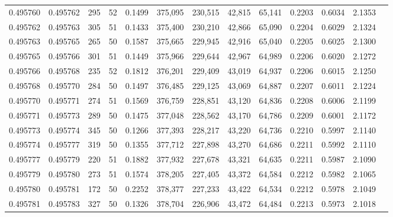 \begin{tabular}{rrrrrrrrrrrrr}
0.495760 & 0.495762 &   295 &  52 &                                     0.1499 & 375,095 & 230,515 &  42,815 &  65,141 & 0.2203 & 0.6034 & 2.1353 \\
0.495762 & 0.495763 &   305 &  51 &                                     0.1433 & 375,400 & 230,210 &  42,866 &  65,090 & 0.2204 & 0.6029 & 2.1324 \\
0.495763 & 0.495765 &   265 &  50 &                                     0.1587 & 375,665 & 229,945 &  42,916 &  65,040 & 0.2205 & 0.6025 & 2.1300 \\
0.495765 & 0.495766 &   301 &  51 &                                     0.1449 & 375,966 & 229,644 &  42,967 &  64,989 & 0.2206 & 0.6020 & 2.1272 \\
0.495766 & 0.495768 &   235 &  52 &                                     0.1812 & 376,201 & 229,409 &  43,019 &  64,937 & 0.2206 & 0.6015 & 2.1250 \\
0.495768 & 0.495770 &   284 &  50 &                                     0.1497 & 376,485 & 229,125 &  43,069 &  64,887 & 0.2207 & 0.6011 & 2.1224 \\
0.495770 & 0.495771 &   274 &  51 &                                     0.1569 & 376,759 & 228,851 &  43,120 &  64,836 & 0.2208 & 0.6006 & 2.1199 \\
0.495771 & 0.495773 &   289 &  50 &                                     0.1475 & 377,048 & 228,562 &  43,170 &  64,786 & 0.2209 & 0.6001 & 2.1172 \\
0.495773 & 0.495774 &   345 &  50 &                                     0.1266 & 377,393 & 228,217 &  43,220 &  64,736 & 0.2210 & 0.5997 & 2.1140 \\
0.495774 & 0.495777 &   319 &  50 &                                     0.1355 & 377,712 & 227,898 &  43,270 &  64,686 & 0.2211 & 0.5992 & 2.1110 \\
0.495777 & 0.495779 &   220 &  51 &                                     0.1882 & 377,932 & 227,678 &  43,321 &  64,635 & 0.2211 & 0.5987 & 2.1090 \\
0.495779 & 0.495780 &   273 &  51 &                                     0.1574 & 378,205 & 227,405 &  43,372 &  64,584 & 0.2212 & 0.5982 & 2.1065 \\
0.495780 & 0.495781 &   172 &  50 &                                     0.2252 & 378,377 & 227,233 &  43,422 &  64,534 & 0.2212 & 0.5978 & 2.1049 \\
0.495781 & 0.495783 &   327 &  50 &                                     0.1326 & 378,704 & 226,906 &  43,472 &  64,484 & 0.2213 & 0.5973 & 2.1018 \\

\end{tabular}
